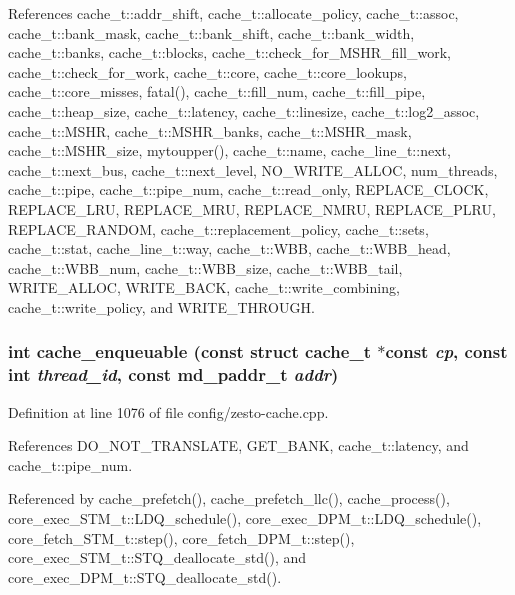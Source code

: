 References cache\_\-t::addr\_\-shift, cache\_\-t::allocate\_\-policy, cache\_\-t::assoc, cache\_\-t::bank\_\-mask, cache\_\-t::bank\_\-shift, cache\_\-t::bank\_\-width, cache\_\-t::banks, cache\_\-t::blocks, cache\_\-t::check\_\-for\_\-MSHR\_\-fill\_\-work, cache\_\-t::check\_\-for\_\-work, cache\_\-t::core, cache\_\-t::core\_\-lookups, cache\_\-t::core\_\-misses, fatal(), cache\_\-t::fill\_\-num, cache\_\-t::fill\_\-pipe, cache\_\-t::heap\_\-size, cache\_\-t::latency, cache\_\-t::linesize, cache\_\-t::log2\_\-assoc, cache\_\-t::MSHR, cache\_\-t::MSHR\_\-banks, cache\_\-t::MSHR\_\-mask, cache\_\-t::MSHR\_\-size, mytoupper(), cache\_\-t::name, cache\_\-line\_\-t::next, cache\_\-t::next\_\-bus, cache\_\-t::next\_\-level, NO\_\-WRITE\_\-ALLOC, num\_\-threads, cache\_\-t::pipe, cache\_\-t::pipe\_\-num, cache\_\-t::read\_\-only, REPLACE\_\-CLOCK, REPLACE\_\-LRU, REPLACE\_\-MRU, REPLACE\_\-NMRU, REPLACE\_\-PLRU, REPLACE\_\-RANDOM, cache\_\-t::replacement\_\-policy, cache\_\-t::sets, cache\_\-t::stat, cache\_\-line\_\-t::way, cache\_\-t::WBB, cache\_\-t::WBB\_\-head, cache\_\-t::WBB\_\-num, cache\_\-t::WBB\_\-size, cache\_\-t::WBB\_\-tail, WRITE\_\-ALLOC, WRITE\_\-BACK, cache\_\-t::write\_\-combining, cache\_\-t::write\_\-policy, and WRITE\_\-THROUGH.
\subsubsection[{cache\_\-enqueuable}]{\setlength{\rightskip}{0pt plus 5cm}int cache\_\-enqueuable (const struct {\bf cache\_\-t} $\ast$const  {\em cp}, \/  const int {\em thread\_\-id}, \/  const {\bf md\_\-paddr\_\-t} {\em addr})}\label{zesto-cache_8h_35c7c82c117f5713ec55d40f831060da}




Definition at line 1076 of file config/zesto-cache.cpp.

References DO\_\-NOT\_\-TRANSLATE, GET\_\-BANK, cache\_\-t::latency, and cache\_\-t::pipe\_\-num.

Referenced by cache\_\-prefetch(), cache\_\-prefetch\_\-llc(), cache\_\-process(), core\_\-exec\_\-STM\_\-t::LDQ\_\-schedule(), core\_\-exec\_\-DPM\_\-t::LDQ\_\-schedule(), core\_\-fetch\_\-STM\_\-t::step(), core\_\-fetch\_\-DPM\_\-t::step(), core\_\-exec\_\-STM\_\-t::STQ\_\-deallocate\_\-std(), and core\_\-exec\_\-DPM\_\-t::STQ\_\-deallocate\_\-std().

